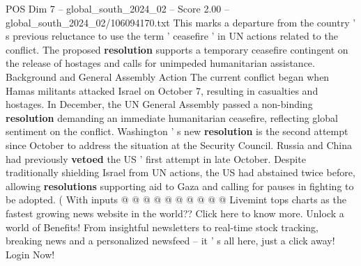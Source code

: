 \begin{textsample}{POS Dim 7 – global\_south\_2024\_02 – Score 2.00 – global\_south\_2024\_02/106094170.txt}
This marks a departure from the country ' s previous reluctance to use the term ' ceasefire ' in UN actions related to the conflict.
The proposed \textbf{resolution} supports a temporary ceasefire contingent on the release of hostages and calls for unimpeded humanitarian assistance.
Background and General Assembly Action The current conflict began when Hamas militants attacked Israel on October 7, resulting in casualties and hostages.
In December, the UN General Assembly passed a non-binding \textbf{resolution} demanding an immediate humanitarian ceasefire, reflecting global sentiment on the conflict.
Washington ' s new \textbf{resolution} is the second attempt since October to address the situation at the Security Council.
Russia and China had previously \textbf{vetoed} the US ' first attempt in late October.
Despite traditionally shielding Israel from UN actions, the US had abstained twice before, allowing \textbf{resolutions} supporting aid to Gaza and calling for pauses in fighting to be adopted. ( With inputs @ @ @ @ @ @ @ @ @ @ Livemint tops charts as the fastest growing news website in the world??
Click here to know more.
Unlock a world of Benefits!
From insightful newsletters to real-time stock tracking, breaking news and a personalized newsfeed -- it ' s all here, just a click away!
Login Now!

\end{textsample}
